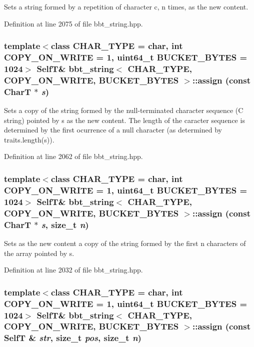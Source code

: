 Sets a string formed by a repetition of character c, n times, as the new content. 

Definition at line 2075 of file bbt\_\-string.hpp.\hypertarget{classbbt__string_aff6d129e3e7ce9472f4e1a152f8d5fd}{
\subsubsection[{assign}]{\setlength{\rightskip}{0pt plus 5cm}template$<$class CHAR\_\-TYPE  = char, int COPY\_\-ON\_\-WRITE = 1, uint64\_\-t BUCKET\_\-BYTES = 1024$>$ {\bf SelfT}\& {\bf bbt\_\-string}$<$ CHAR\_\-TYPE, COPY\_\-ON\_\-WRITE, BUCKET\_\-BYTES $>$::assign (const CharT $\ast$ {\em s})}}
\label{classbbt__string_aff6d129e3e7ce9472f4e1a152f8d5fd}


Sets a copy of the string formed by the null-terminated character sequence (C string) pointed by s as the new content. The length of the caracter sequence is determined by the first ocurrence of a null character (as determined by traits.length(s)). 

Definition at line 2062 of file bbt\_\-string.hpp.\hypertarget{classbbt__string_2f40712bf2f31915bfad61172f224827}{
\subsubsection[{assign}]{\setlength{\rightskip}{0pt plus 5cm}template$<$class CHAR\_\-TYPE  = char, int COPY\_\-ON\_\-WRITE = 1, uint64\_\-t BUCKET\_\-BYTES = 1024$>$ {\bf SelfT}\& {\bf bbt\_\-string}$<$ CHAR\_\-TYPE, COPY\_\-ON\_\-WRITE, BUCKET\_\-BYTES $>$::assign (const CharT $\ast$ {\em s}, \/  size\_\-t {\em n})}}
\label{classbbt__string_2f40712bf2f31915bfad61172f224827}


Sets as the new content a copy of the string formed by the first n characters of the array pointed by s. 

Definition at line 2032 of file bbt\_\-string.hpp.\hypertarget{classbbt__string_9fa5926de65736614641d94c9cba83bf}{
\subsubsection[{assign}]{\setlength{\rightskip}{0pt plus 5cm}template$<$class CHAR\_\-TYPE  = char, int COPY\_\-ON\_\-WRITE = 1, uint64\_\-t BUCKET\_\-BYTES = 1024$>$ {\bf SelfT}\& {\bf bbt\_\-string}$<$ CHAR\_\-TYPE, COPY\_\-ON\_\-WRITE, BUCKET\_\-BYTES $>$::assign (const {\bf SelfT} \& {\em str}, \/  size\_\-t {\em pos}, \/  size\_\-t {\em n})}}
\label{classbbt__string_9fa5926de65736614641d94c9cba83bf}


